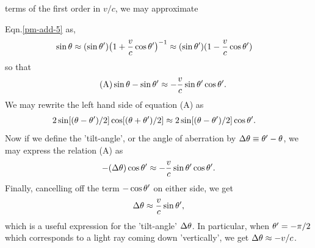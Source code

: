 terms of the first order in $v/c$, we may approximate  
 
Eqn.\eqref{pm-add-5} as,
\begin{align*}
 \sin{\theta}&\approx(\sin{\theta}')
\big(1+\frac{v}{c}\cos{\theta}'\big)^{-1}\approx
(\sin{\theta}')(1-\frac{v}{c}\cos{\theta}')
\end{align*}
so that
\begin{align*}\tag{A}
&\sin{\theta}-\sin{\theta}'\approx 
-\frac{v}{c}\sin{\theta}'\cos{\theta}'.\end{align*}
We may rewrite the left hand side of equation (A) as 
\begin{align*}
&2\sin[({\theta}-{\theta}')/2]\cos[({\theta}+{\theta}')/2]  
\approx2\sin[({\theta}-{\theta}')/2]\cos{\theta}'.
\end{align*}
Now if we define the 'tilt-angle', or the angle of 
aberration by $\Delta{\theta}\equiv {\theta}'-{\theta}$, we may 
express 
the  relation (A) as
\begin{align*}
-(\Delta{\theta})\cos{\theta}'\approx 
-\frac{v}{c}\sin{\theta}'\cos{\theta}'.
\end{align*}
Finally, cancelling off the term $-\cos{\theta}'$ on 
either 
side, we get
\begin{align}
\Delta{\theta}\approx \frac{v}{c}\sin{\theta}',
\end{align}
which is a useful expression for the 'tilt-angle'  
$\Delta{\theta}$. In particular, when ${\theta}'=-\pi/2$ which 
corresponds to a light ray coming down 'vertically', we 
get 
$\Delta{\theta}\approx -v/c$.

